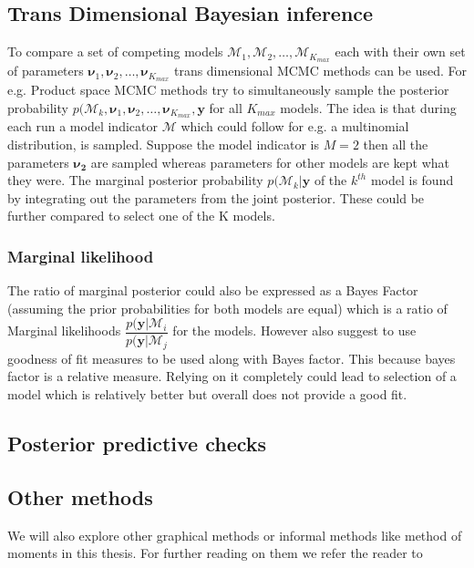 \subsection{Trans Dimensional Bayesian inference}
To compare a set of competing models $\mathcal{M}_1, \mathcal{M}_2, \ldots, \mathcal{M}_{K_{max}}$ each with their own set of parameters $\boldsymbol{\nu}_1, \boldsymbol{\nu}_2, \ldots, \boldsymbol{\nu}_{K_{max}}$ trans dimensional MCMC methods can be used. For e.g. Product space MCMC methods try to simultaneously sample the posterior probability $p(\mathcal{M}_{k}, \boldsymbol{\nu}_1, \boldsymbol{\nu}_2, \ldots, \boldsymbol{\nu}_{K_{max}}, \boldsymbol{y}$ for all $K_{max}$ models. The idea is that during each run a model indicator $\mathcal{M}$ which could follow for e.g. a multinomial distribution, is sampled. Suppose the model indicator is $M=2$ then all the parameters $\boldsymbol{\nu_{2}}$ are sampled whereas parameters for other models are kept what they were. The marginal posterior probability $p(\mathcal{M}_k|\boldsymbol{y}$ of the $k^{th}$ model is found by integrating out the parameters from the joint posterior. These could be further compared to select one of the K models.\\

\subsubsection{Marginal likelihood}
The ratio of marginal posterior could also be expressed as a Bayes Factor (assuming the prior probabilities for both models are equal) which is a ratio of Marginal likelihoods $\dfrac{p(\boldsymbol{y}|\mathcal{M}_i}{p(\boldsymbol{y}|\mathcal{M}_j}$ for the models. 
However \citet{johannes_berkhof_bayesian_2003} also suggest to use goodness of fit measures to be used along with Bayes factor. This because bayes factor is a relative measure. Relying on it completely could lead to selection of a model which is relatively better but overall does not provide a good fit.

\subsection{Posterior predictive checks}


\subsection{Other methods}
We will also explore other graphical methods or informal methods like method of moments in this thesis. For further reading on them we refer the reader to \citet[pg. 107-114]{fruhwirth-schnatter_finite_2013}